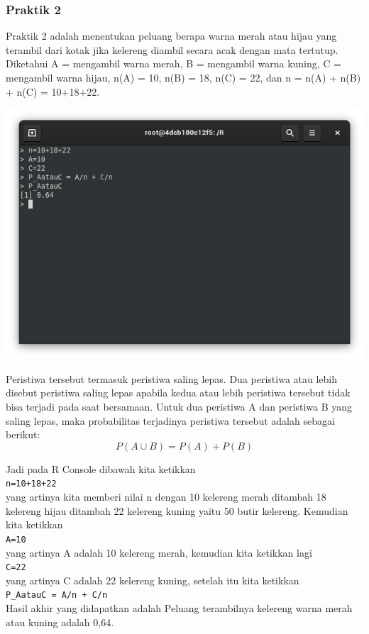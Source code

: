\documentclass[a4paper,12pt]{article}
\begin{document}
\subsubsection{Praktik 2}
Praktik 2 adalah menentukan peluang berapa warna merah atau hijau yang terambil dari kotak jika kelereng diambil secara acak dengan mata  tertutup. Diketahui A = mengambil warna merah, B = mengambil warna kuning, C = mengambil warna hijau, n(A) = 10, n(B) = 18, n(C) = 22, dan n = n(A) + n(B) + n(C) = 10+18+22.
\begin{center}
	\includegraphics[scale=.5]{prak2}
\end{center} 
Peristiwa tersebut termasuk peristiwa saling lepas. Dua peristiwa atau lebih disebut peristiwa saling lepas apabila kedua atau lebih peristiwa tersebut tidak bisa terjadi pada saat bersamaan. Untuk dua peristiwa A dan peristiwa B yang saling lepas, maka probabilitas terjadinya peristiwa tersebut adalah sebagai berikut:
\[ P(A \cup B) = P(A)+P(B) \]

Jadi pada R Console dibawah kita ketikkan\\ 
\texttt{n=10+18+22}\\
yang artinya kita memberi nilai n dengan 10 kelereng merah ditambah 18 kelereng hijau ditambah 22 kelereng kuning yaitu 50 butir kelereng. Kemudian kita ketikkan\\ 
\texttt{A=10}\\ 
yang artinya A adalah 10 kelereng merah, kemudian kita ketikkan lagi\\ 
\texttt{C=22}\\ 
yang artinya C adalah 22 kelereng kuning, setelah itu kita ketikkan\\  \texttt{P\_AatauC = A/n + C/n}\\ 
Hasil akhir yang didapatkan adalah Peluang terambilnya kelereng warna merah atau kuning adalah 0,64.
 
\end{document}
